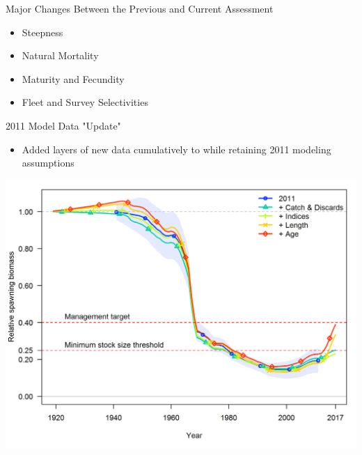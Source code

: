 \documentclass[pdf]{beamer}\usepackage[]{graphicx}\usepackage[]{color}
\begin{document}
\begin{frame}{Major Changes Between the Previous and Current Assessment}
  \begin{itemize}
    \item Steepness 
    \item Natural Mortality
    \item Maturity and Fecundity
    \item Fleet and Survey Selectivities 
  \end{itemize}
\end{frame}

\begin{frame}{2011 Model Data "Update"}
  \begin{itemize}
    \item Added layers of new data cumulatively to while retaining 2011 modeling assumptions
  \end{itemize}
  \begin{center}
    \includegraphics[scale = 0.42]{figures/compare4_Bratio_uncertainty.png}
  \end{center}
\end{frame}
\end{document}
